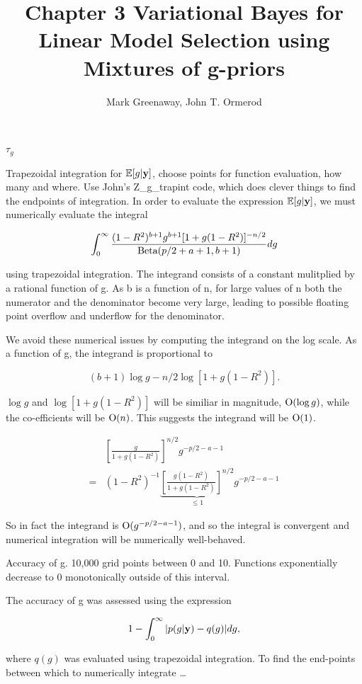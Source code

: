\documentclass{amsart}[12pt]
\title{Chapter 3 Variational Bayes for Linear Model Selection using Mixtures of g-priors}
\author{Mark Greenaway, John T. Ormerod}
\newcommand{\mgc}[1]{{\color{blue}#1}}
\begin{document}
\maketitle

$\tau_g$

\mgc{Trapezoidal integration for $\mathbb{E}[g | {\bf y}]$, choose points for function evaluation, how many and where. Use
John's Z\_g\_trapint code, which does clever things to find the endpoints of integration.
}
In order to evaluate the expression $\mathbb{E}[g | {\bf y}]$, we must numerically evaluate the integral

\[
	\int_0^\infty \frac{(1-R^2)^{b+1} g^{b+1} [1 + g(1 - R^2)]^{-n/2}}{\text{Beta}(p/2 + a + 1, b + 1)} dg
\]

using trapezoidal integration. The integrand consists of a constant mulitplied by a rational function of g. As
b is a function of n, for large values of n both the numerator and the denominator become very large, leading
to possible floating point overflow and underflow for the denominator.

We avoid these numerical issues by computing the integrand on the log scale. As a function of g, the integrand
is proportional to

\[
	(b + 1) \log{g} - n / 2 \log{[1 + g(1 - R^2)]}.
\]

$\log{g}$ and $\log{[1 + g(1 - R^2)]}$ will be similiar in magnitude, $\text{O}{(\log{g})}$, while the
co-efficients will be $\text{O}{(n)}$. This suggests the integrand will be $\text{O}{(1)}$.

\begin{align*}
	&\left[\frac{g}{1 + g(1 - R^2)}\right]^{n/2} g^{-p/2 -a - 1} \\
	=&(1 - R^2)^{-1} \underbrace{\left[\frac{g(1 - R^2)}{1 + g(1 - R^2)}\right]^{n/2}}_{ \leq 1} g^{-p/2 - a - 1}
\end{align*}

So in fact the integrand is $\text{O}{(g^{-p/2 - a - 1})}$, and so the integral is convergent and numerical
integration will be numerically well-behaved.

\mgc{Accuracy of g. 10,000 grid points between 0 and 10. Functions exponentially decrease to 0 monotonically
outside of this interval.
}

The accuracy of g was assessed using the expression

\[
	1 - \int_0^\infty |p(g | {\bf y}) - q(g)| dg,
\]

where $q(g)$ was evaluated using trapezoidal integration. To find the end-points between which to numerically
integrate \ldots
\end{document}
